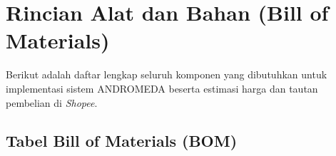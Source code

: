 \documentclass[12pt,a4paper,oneside]{report}
\begin{document}
\newpage
\section{Rincian Alat dan Bahan (Bill of Materials)}

Berikut adalah daftar lengkap seluruh komponen yang dibutuhkan untuk implementasi sistem ANDROMEDA beserta estimasi harga dan tautan pembelian di \textit{Shopee}.


\subsection{Tabel Bill of Materials (BOM)}
\end{document}
